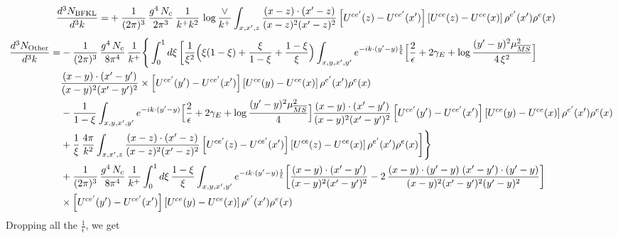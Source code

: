 \documentclass[9pt]{article}
\numberwithin{equation}{section}
\begin{document}
\begin{align}
\frac{d^{3}N_{\rm BFKL}}{d^{3}k}= &    +\frac{1}{(2\pi)^{3}}\,\frac{g^{4}\,N_{c}}{2\pi^{3}}\,\frac{1}{k^{+}k^{2}}\,\log\frac{\vee}{k^{+}}\int_{x,x',z}\frac{(x-z)\cdot(x'-z)}{(x-z)^{2}(x'-z)^{2}}\left[U^{ce'}(z) - U^{ce'}(x')\right]\left[U^{ce}(z) - U^{ce}(x)\right]\rho^{e'}(x')\rho^{e}(x)
\end{align}
\begin{align}
\frac{d^{3}N_{\rm Other}}{d^{3}k}= &-\frac{1}{(2\pi)^{3}}\,\frac{g^{4}\,N_{c}}{8\pi^{4}}\,\frac{1}{k^{+}}\Bigg\{\int_{0}^{1}d\xi\,\bigg[\frac{1}{\xi^{2}}\Big(\xi(1-\xi)+\frac{\xi}{1-\xi}+\frac{1-\xi}{\xi}\Big)\int_{x,y,x',y'}e^{-ik\cdot(y'-y)\frac{1}{\xi}}\Big[\frac{2}{\epsilon}+2\gamma_{E}+\log\frac{(y'-y)^{2}\mu^{2}_{\overline{MS}}}{4\,\xi^{2}}\Big]\notag \\ & \frac{(x-y)\cdot(x'-y')}{(x-y)^{2}(x'-y')^{2}}\times\left[U^{ce'}(y') - U^{ce'}(x')\right]\left[U^{ce}(y) - U^{ce}(x)\right]\rho^{e'}(x')\rho^{e}(x)\notag\\
&-\frac{1}{1-\xi}\int_{x,y,x',y'}e^{-ik\cdot(y'-y)}\Big[\frac{2}{\epsilon}+2\gamma_{E}+\log\frac{(y'-y)^{2}\mu^{2}_{\overline{MS}}}{4}\Big]\frac{(x-y)\cdot(x'-y')}{(x-y)^{2}(x'-y')^{2}}\left[U^{ce'}(y') - U^{ce'}(x')\right]\left[U^{ce}(y) - U^{ce}(x)\right]\rho^{e'}(x')\rho^{e}(x)\notag\\
&+\frac{1}{\xi}\,\frac{4\pi}{k^{2}}\int_{x,x',z}\frac{(x-z)\cdot(x'-z)}{(x-z)^{2}(x'-z)^{2}}\left[U^{ce'}(z) - U^{ce'}(x')\right]\left[U^{ce}(z) - U^{ce}(x)\right]\rho^{e'}(x')\rho^{e}(x)\bigg]\Bigg\}\notag\\
&+\frac{1}{(2\pi)^{3}}\,\frac{g^{4}\,N_{c}}{8\pi^{4}}\,\frac{1}{k^{+}}\int_{0}^{1}d\xi\,\frac{1-\xi}{\xi}\int_{x,y,x',y'}e^{-ik\cdot(y'-y)\frac{1}{\xi}}\bigg[\frac{(x-y)\cdot(x'-y')}{(x-y)^{2}(x'-y')^{2}}-2\,\frac{(x-y)\cdot(y'-y)\;(x'-y')\cdot(y'-y)}{(x-y)^{2}(x'-y')^{2}(y'-y)^{2}}\bigg]\notag\\
&\times\left[U^{ce'}(y') - U^{ce'}(x')\right]\left[U^{ce}(y) - U^{ce}(x)\right]\rho^{e'}(x')\rho^{e}(x)
\end{align}
Dropping all the $\frac{1}{\epsilon}$, we get
\end{document}
